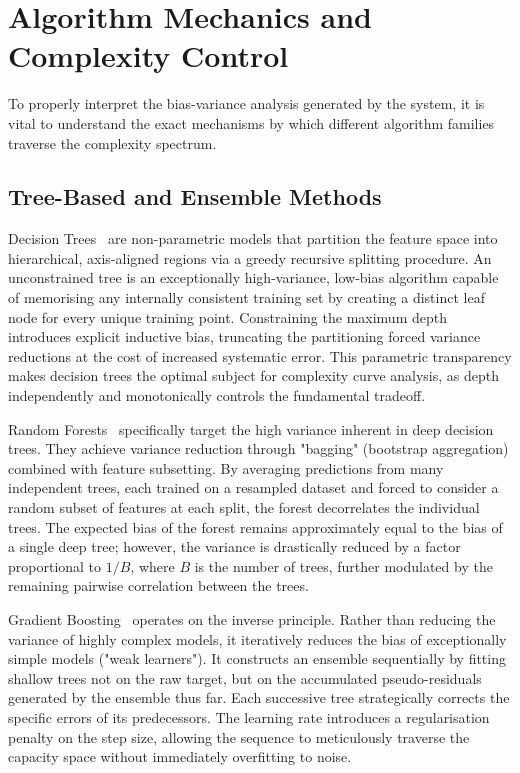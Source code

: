 \documentclass[conference]{IEEEtran}
\begin{document}
\section{Algorithm Mechanics and Complexity Control}

To properly interpret the bias-variance analysis generated by the system, it is vital to understand the exact mechanisms by which different algorithm families traverse the complexity spectrum.

\subsection{Tree-Based and Ensemble Methods}

Decision Trees~\cite{b9} are non-parametric models that partition the feature space into hierarchical, axis-aligned regions via a greedy recursive splitting procedure. An unconstrained tree is an exceptionally high-variance, low-bias algorithm capable of memorising any internally consistent training set by creating a distinct leaf node for every unique training point. Constraining the maximum depth introduces explicit inductive bias, truncating the partitioning forced variance reductions at the cost of increased systematic error. This parametric transparency makes decision trees the optimal subject for complexity curve analysis, as depth independently and monotonically controls the fundamental tradeoff.

Random Forests~\cite{b12} specifically target the high variance inherent in deep decision trees. They achieve variance reduction through "bagging" (bootstrap aggregation) combined with feature subsetting. By averaging predictions from many independent trees, each trained on a resampled dataset and forced to consider a random subset of features at each split, the forest decorrelates the individual trees. The expected bias of the forest remains approximately equal to the bias of a single deep tree; however, the variance is drastically reduced by a factor proportional to $1/B$, where $B$ is the number of trees, further modulated by the remaining pairwise correlation between the trees.

Gradient Boosting~\cite{b13} operates on the inverse principle. Rather than reducing the variance of highly complex models, it iteratively reduces the bias of exceptionally simple models ("weak learners"). It constructs an ensemble sequentially by fitting shallow trees not on the raw target, but on the accumulated pseudo-residuals generated by the ensemble thus far. Each successive tree strategically corrects the specific errors of its predecessors. The learning rate introduces a regularisation penalty on the step size, allowing the sequence to meticulously traverse the capacity space without immediately overfitting to noise.
\end{document}
